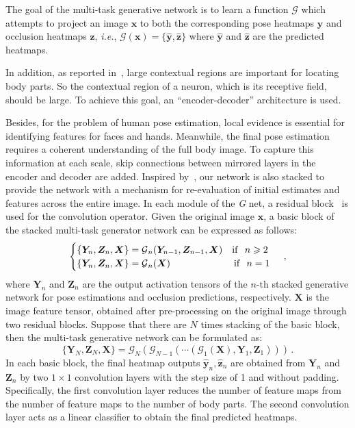 \documentclass[10pt,letterpaper,twocolumn]{article}
\begin{document}
\def\x{ { \bm x } }

The goal of the multi-task generative network is to learn a function $\mathcal{G}$ which attempts to project an image $\bm{x}$ to both the corresponding pose heatmaps $\bm{y}$ and occlusion heatmaps $\bm{z}$, \emph{i.e.}, $\mathcal{G}(\x) =  \{\hat{\bm{y}}, \hat{\bm{z}}\}$ where $\hat{\bm{y}}$ and $\hat{\bm{z}}$ are the predicted heatmaps.

In addition, as reported in~\cite{conf/cvpr/WeiRKS16}, large contextual regions are important for locating body parts. So the contextual region of a neuron, which is its receptive field, should be large. To achieve this goal, an ``encoder-decoder'' architecture is used.

Besides, for the problem of human pose estimation, local evidence is essential for identifying features for faces and hands. Meanwhile, the final pose estimation requires a coherent understanding of the full body image. To capture this information at each scale, skip connections between mirrored layers in the encoder and decoder are added. Inspired by~\cite{conf/eccv/NewellYD16}, our network is also stacked to provide the network with a mechanism for re-evaluation of initial estimates and features across the entire image. In each module of the \textit{G} net, a residual block~\cite{conf/cvpr/HeZRS16} is used for the convolution operator. Given the original image $\bm{x}$, a basic block of the stacked multi-task generator network can be expressed as follows:
\begin{equation}
\nonumber
\begin{cases}
\{\bm{Y}_{n},\bm{Z}_{n},\bm{X}\}=\mathcal{G}{}_{n}(\bm{Y}_{n-1},\bm{Z}_{n-1},\bm{X})  \quad{\rm if~~}n\geqslant2\\
\{\bm{Y}_{n},\bm{Z}_{n},\bm{X}\}=\mathcal{G}{}_{n}(\bm{X})\quad\quad\quad\quad\quad\quad~~ {\rm if~~} n=1
\end{cases}
\,,
\end{equation}
where $\bm{Y}_{n}$ and $\bm{Z}_{n}$ are the output activation tensors of the $n\textrm{-th}$ stacked generative network for pose estimations and occlusion predictions, respectively. $\bm{X}$ is the image feature tensor, obtained
after pre-processing on the original image through two residual blocks.
Suppose that there are $N$ times stacking of the basic block, then the multi-task generative network can be formulated as:
\begin{equation}
\nonumber
\{\bm{Y}_{N},\bm{Z}_{N},\bm{X}\}=\mathcal{G}_{N}(\mathcal{G}_{N-1}(\cdots(\mathcal{G}_{1}(\bm{X}),\bm{Y}_{1},\bm{Z}_{1}))) \,.
\end{equation}
In each basic block, the final heatmap outputs $\hat{\bm{y}}_{n},\hat{\bm{z}}_{n}$ are obtained from $\bm{Y}_{n}$ and $\bm{Z}_{n}$ by two $1\times 1$ convolution layers with the step size of 1 and without padding. Specifically, the first convolution layer reduces the number of feature maps from the number of feature maps to the number of body parts. The second convolution layer acts as a linear classifier to obtain the final predicted heatmaps.
\end{document}
